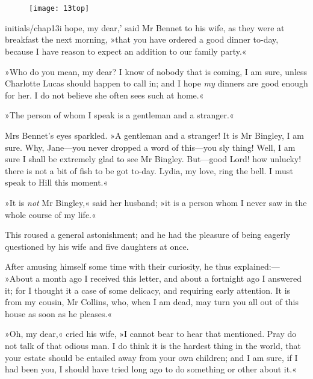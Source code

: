 \chapter[Chapter \thechapter]{}
	
	\begin{figure}[t!]
\centering
\texttt{[image: 13top]}
\end{figure}

\lettrine[ante=`,lines=4,image=true,findent=5pt,realheight=true]{initials/chap13i}{} hope, my dear,' said Mr Bennet to his wife, as they were at breakfast the next morning, »that you have ordered a good dinner to-day, because I have reason to expect an addition to our family party.«

\zz
»Who do you mean, my dear? I know of nobody that is coming, I am sure, unless Charlotte Lucas should happen to call in; and I hope \textit{my} dinners are good enough for her. I do not believe she often sees such at home.«

»The person of whom I speak is a gentleman and a stranger.«

Mrs Bennet's eyes sparkled. »A gentleman and a stranger! It is Mr Bingley, I am sure. Why, Jane—you never dropped a word of this—you sly thing! Well, I am sure I shall be extremely glad to see Mr Bingley. But—good Lord! how unlucky! there is not a bit of fish to be got to-day. Lydia, my love, ring the bell. I must speak to Hill this moment.«

»It is \textit{not} Mr Bingley,« said her husband; »it is a person whom I never saw in the whole course of my life.«

This roused a general astonishment; and he had the pleasure of being eagerly questioned by his wife and five daughters at once.

After amusing himself some time with their curiosity, he thus explained:— »About a month ago I received this letter, and about a fortnight ago I answered it; for I thought it a case of some delicacy, and requiring early attention. It is from my cousin, Mr Collins, who, when I am dead, may turn you all out of this house as soon as he pleases.«

»Oh, my dear,« cried his wife, »I cannot bear to hear that mentioned. Pray do not talk of that odious man. I do think it is the hardest thing in the world, that your estate should be entailed away from your own children; and I am sure, if I had been you, I should have tried long ago to do something or other about it.«

